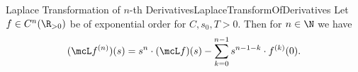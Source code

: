 \begin{mlem}{Laplace Transformation of $n$-th Derivatives}{LaplaceTransformOfDerivatives}
    Let $f\in C^n(\R_{>0})$ be of exponential order for $C,s_0,T>0$. Then for $n\in\N$ we have
    \[
        (\mcL f^{(n)})(s) = s^n\cdot(\mcL f)(s) - \sum_{k=0}^{n-1}s^{n-1-k}\cdot f^{(k)}(0).
    \]    
\end{mlem}